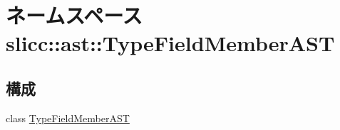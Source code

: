 \hypertarget{namespaceslicc_1_1ast_1_1TypeFieldMemberAST}{
\section{ネームスペース slicc::ast::TypeFieldMemberAST}
\label{namespaceslicc_1_1ast_1_1TypeFieldMemberAST}
}
\subsection*{構成}
\begin{DoxyCompactItemize}
\item 
class \hyperlink{classslicc_1_1ast_1_1TypeFieldMemberAST_1_1TypeFieldMemberAST}{TypeFieldMemberAST}
\end{DoxyCompactItemize}
